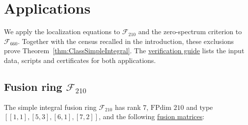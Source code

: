 \documentclass{amsart}
\begin{document}
\section{Applications}\label{sec:app}
We apply the localization equations to $\mathcal F_{210}$ and the zero-spectrum criterion to $\mathcal F_{660}$. Together with the census recalled in the introduction, these exclusions prove Theorem~\ref{thm:ClassSimpleIntegral}. The \href{https://github.com/sebastienpalcoux/triangular-prism-categorification/blob/f816c697fde088b261e1fe1ce703980e5dbdab51/GUIDE.md#4-verify-the-papers-applications}{verification guide} lists the input data, scripts and certificates for both applications.

\subsection{Fusion ring \texorpdfstring{$\mathcal{F}_{210}$}{F210}} \label{sub:F210}
The simple integral fusion ring $\mathcal{F}_{210}$ has rank $7$, $\mathrm{FPdim}$  $210$ and type $[[1,1],[5,3],[6,1],[7,2]]$, and the following \href{https://github.com/sebastienpalcoux/triangular-prism-categorification/blob/f816c697fde088b261e1fe1ce703980e5dbdab51/data/f210.json}{fusion matrices}:
\end{document}
